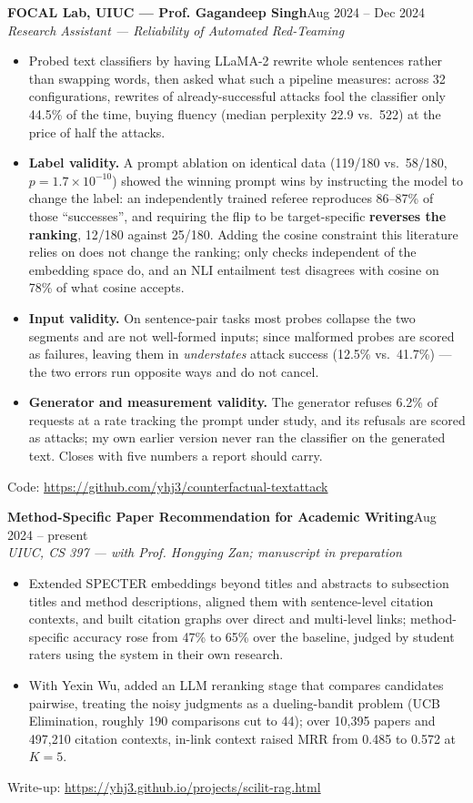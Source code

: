 \documentclass[10pt,letterpaper]{article}
\newcommand{\entry}[3]{\noindent\textbf{#1}\hfill #2\\ \textit{#3}\vspace{1pt}}
\newcommand{\code}[1]{\small Code: \url{#1}}
\begin{document}
\entry{FOCAL Lab, UIUC --- Prof. Gagandeep Singh}{Aug 2024 -- Dec 2024}{Research Assistant --- Reliability of Automated Red-Teaming}
\begin{itemize}
\item Probed text classifiers by having LLaMA-2 rewrite whole sentences rather than swapping words,
      then asked what such a pipeline measures: across 32 configurations, rewrites of
      already-successful attacks fool the classifier only 44.5\% of the time, buying fluency (median
      perplexity 22.9 vs.\ 522) at the price of half the attacks.
\item \textbf{Label validity.} A prompt ablation on identical data (119/180 vs.\ 58/180,
      $p=1.7\times10^{-10}$) showed the winning prompt wins by instructing the model to change the
      label: an independently trained referee reproduces 86--87\% of those ``successes'', and
      requiring the flip to be target-specific \textbf{reverses the ranking}, 12/180 against 25/180.
      Adding the cosine constraint this literature relies on does not change the ranking; only checks
      independent of the embedding space do, and an NLI entailment test disagrees with cosine on 78\%
      of what cosine accepts.
\item \textbf{Input validity.} On sentence-pair tasks most probes collapse the two segments and are
      not well-formed inputs; since malformed probes are scored as failures, leaving them in
      \emph{understates} attack success (12.5\% vs.\ 41.7\%) --- the two errors run opposite ways
      and do not cancel.
\item \textbf{Generator and measurement validity.} The generator refuses 6.2\% of requests at a rate
      tracking the prompt under study, and its refusals are scored as attacks; my own earlier version
      never ran the classifier on the generated text. Closes with five numbers a report should carry.
\end{itemize}
\code{https://github.com/yhj3/counterfactual-textattack}

\entry{Method-Specific Paper Recommendation for Academic Writing}{Aug 2024 -- present}{UIUC, CS 397 --- with Prof. Hongying Zan; manuscript in preparation}
\begin{itemize}
\item Extended SPECTER embeddings beyond titles and abstracts to subsection titles and method
      descriptions, aligned them with sentence-level citation contexts, and built citation graphs over
      direct and multi-level links; method-specific accuracy rose from 47\% to 65\% over the
      baseline, judged by student raters using the system in their own research.
\item With Yexin Wu, added an LLM reranking stage that compares candidates pairwise, treating the
      noisy judgments as a dueling-bandit problem (UCB Elimination, roughly 190 comparisons cut to
      44); over 10,395 papers and 497,210 citation contexts, in-link context raised MRR from 0.485
      to 0.572 at $K=5$.
\end{itemize}
{\small Write-up: \url{https://yhj3.github.io/projects/scilit-rag.html}}
\end{document}
